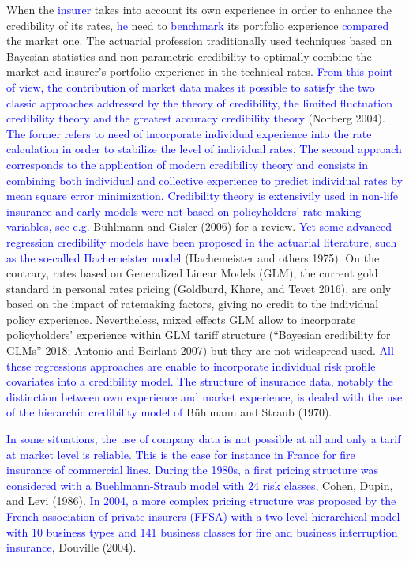 \documentclass[
]{article}
\begin{document}
When the \textcolor{blue}{insurer} takes into account its own experience
in order to enhance the credibility of its rates, \textcolor{blue}{he}
need to \textcolor{blue}{benchmark} its portfolio experience
\textcolor{blue}{compared} the market one. The actuarial profession
traditionally used techniques based on Bayesian statistics and
non-parametric credibility to optimally combine the market and insurer's
portfolio experience in the technical rates.
\textcolor{blue}{From this point of view, the contribution of market data makes it possible to satisfy the two classic approaches addressed by the theory of credibility, the limited fluctuation credibility theory and the greatest accuracy credibility theory}
(Norberg 2004).
\textcolor{blue}{The former refers to need of incorporate individual experience into the rate calculation in order to stabilize the level of individual rates. The second approach corresponds to the application of modern credibility theory and consists in combining both individual and collective experience to predict individual rates by mean square error minimization. Credibility theory is extensivily used in non-life insurance and early models were not based on policyholders’ rate-making variables, see e.g.}
Bühlmann and Gisler (2006) for a review.
\textcolor{blue}{Yet some advanced regression credibility models have been proposed in the actuarial literature, such as the so-called Hachemeister model}
(Hachemeister and others 1975). On the contrary, rates based on
Generalized Linear Models (GLM), the current gold standard in personal
rates pricing (Goldburd, Khare, and Tevet 2016), are only based on the
impact of ratemaking factors, giving no credit to the individual policy
experience. Nevertheless, mixed effects GLM allow to incorporate
policyholders' experience within GLM tariff structure ({``{Bayesian
credibility for GLMs}''} 2018; Antonio and Beirlant 2007) but they are
not widespread used.
\textcolor{blue}{All these regressions approaches are enable to incorporate individual risk profile covariates into a credibility model. The structure of insurance data, notably the distinction between own experience and market experience, is dealed with the use of the hierarchic credibility model of}
Bühlmann and Straub (1970).

\textcolor{blue}{In some situations, the use of company data is not possible at all
and only a tarif at market level is reliable. This is the case for instance in France
for fire insurance of commercial lines. During the 1980s, a first pricing structure 
was considered with a Buehlmann-Straub model with 24 risk classes},
Cohen, Dupin, and Levi (1986).
\textcolor{blue}{In 2004, a more complex pricing structure was proposed by the
French association of private insurers (FFSA) with a two-level hierarchical model with
10 business types and 141 business classes for fire and business
interruption insurance,} Douville (2004).
\end{document}
